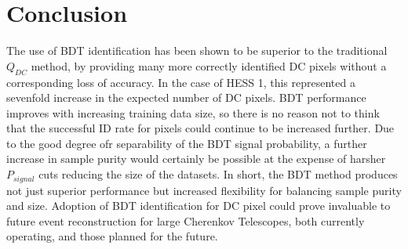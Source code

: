 \documentclass[]{article}
\begin{document}
\section{Conclusion}
The use of BDT identification has been shown to be superior to the traditional $Q_{DC}$ method, by providing many more correctly identified DC pixels without a corresponding loss of accuracy. In the case of HESS 1, this represented a sevenfold increase in the expected number of DC pixels. BDT performance improves with increasing training data size, so there is no reason not to think that the successful ID rate for pixels could continue to be increased further. Due to the good degree ofr separability of the BDT signal probability, a further increase in sample purity would certainly be possible at the expense of harsher 
$P_{signal}$ cuts reducing the size of the datasets. In short, the BDT method produces not just superior performance but increased flexibility for balancing sample purity and size. Adoption of BDT identification for DC pixel could prove invaluable to future event reconstruction for large Cherenkov Telescopes, both currently operating, and those planned for the future.


\end{document}
